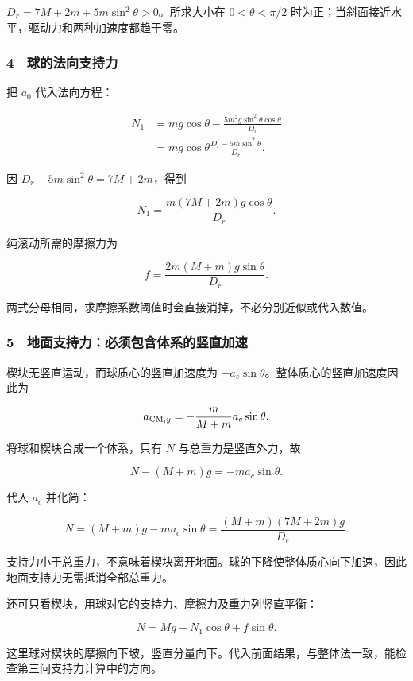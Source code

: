 \documentclass[12pt,a4paper,fontset=fandol]{ctexart}
\begin{document}
\(D_r=7M+2m+5m\sin^2\theta>0\)。所求大小在 \(0<\theta<\pi/2\)
时为正；当斜面接近水平，驱动力和两种加速度都趋于零。

\subsubsection{4　球的法向支持力}\label{ux7403ux7684ux6cd5ux5411ux652fux6301ux529b}

把 \(a_0\) 代入法向方程：

\[\begin{aligned}
N_1&=mg\cos\theta-
\frac{5m^2g\sin^2\theta\cos\theta}{D_r}\\
&=mg\cos\theta\frac{D_r-5m\sin^2\theta}{D_r}.
\end{aligned}\]

因 \(D_r-5m\sin^2\theta=7M+2m\)，得到

\[\boxed{N_1=\frac{m(7M+2m)g\cos\theta}{D_r}.}\]

纯滚动所需的摩擦力为

\[\boxed{f=\frac{2m(M+m)g\sin\theta}{D_r}.}\]

两式分母相同，求摩擦系数阈值时会直接消掉，不必分别近似或代入数值。

\subsubsection{5　地面支持力：必须包含体系的竖直加速}\label{ux5730ux9762ux652fux6301ux529bux5fc5ux987bux5305ux542bux4f53ux7cfbux7684ux7ad6ux76f4ux52a0ux901f}

楔块无竖直运动，而球质心的竖直加速度为
\(-a_c\sin\theta\)。整体质心的竖直加速度因此为

\[a_{{\rm CM},y}=-\frac{m}{M+m}a_c\sin\theta.\]

将球和楔块合成一个体系，只有 \(N\) 与总重力是竖直外力，故

\[N-(M+m)g=-ma_c\sin\theta.\]

代入 \(a_c\) 并化简：

\[\boxed{N=(M+m)g-ma_c\sin\theta
=\frac{(M+m)(7M+2m)g}{D_r}.}\]

支持力小于总重力，不意味着楔块离开地面。球的下降使整体质心向下加速，因此地面支持力无需抵消全部总重力。

还可只看楔块，用球对它的支持力、摩擦力及重力列竖直平衡：

\[N=Mg+N_1\cos\theta+f\sin\theta.\]

这里球对楔块的摩擦向下坡，竖直分量向下。代入前面结果，与整体法一致，能检查第三问支持力计算中的方向。
\end{document}
